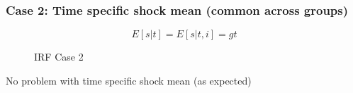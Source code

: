 \documentclass[notes,11pt, aspectratio = 169]{beamer}
\begin{document}
\begin{frame}\frametitle{Case 2: Time specific shock mean (common across groups)}
    \[E[s|t]=E[s|t,i]=g t \] 
    
    \begin{figure}
        \centering
      \caption{IRF Case 2}
      \end{figure}
      
      No problem with time specific shock mean (as expected)
    

\end{frame}
\end{document}
